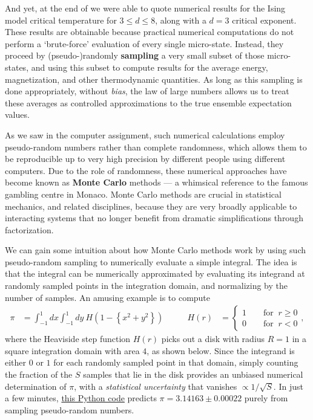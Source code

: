And yet, at the end of  we were able to quote numerical results for the Ising model critical temperature for $3 \leq d \leq 8$, along with a $d = 3$ critical exponent.
These results are obtainable because practical numerical computations do not perform a `brute-force' evaluation of every single micro-state.
Instead, they proceed by (pseudo-)randomly \textbf{sampling} a very small subset of those micro-states, and using this subset to compute results for the average energy, magnetization, and other thermodynamic quantities.
As long as this sampling is done appropriately, without \textit{bias}, the law of large numbers allows us to treat these averages as controlled approximations to the true ensemble expectation values.

As we saw in the computer assignment, such numerical calculations employ pseudo-random numbers rather than complete randomness, which allows them to be reproducible up to very high precision by different people using different computers.
Due to the role of randomness, these numerical approaches have become known as \textbf{Monte Carlo} methods --- a whimsical reference to the famous gambling centre in Monaco.
Monte Carlo methods are crucial in statistical mechanics, and related disciplines, because they are very broadly applicable to interacting systems that no longer benefit from dramatic simplifications through factorization.

We can gain some intuition about how Monte Carlo methods work by using such pseudo-random sampling to numerically evaluate a simple integral.
The idea is that the integral can be numerically approximated by evaluating its integrand at randomly sampled points in the integration domain, and normalizing by the number of samples.
An amusing example is to compute
\begin{align*}
  \pi & = \int_{-1}^1 dx \int_{-1}^1 dy \ H\!\left(1 - \left\{x^2 + y^2\right\}\right) \qquad &
  H(r) & = \left\{\begin{array}{l}1 \qquad \mbox{for } \ r \geq 0 \\
                                  0 \qquad \mbox{for } \ r < 0\end{array}\right. ,
\end{align*}
where the Heaviside step function $H(r)$ picks out a disk with radius $R = 1$ in a square integration domain with area $4$, as shown below.
Since the integrand is either $0$ or $1$ for each randomly sampled point in that domain, simply counting the fraction of the $S$ samples that lie in the disk provides an unbiased numerical determination of $\pi$, with a \textit{statistical uncertainty} that vanishes $\propto 1 / \sqrt{S}$.
In just a few minutes, \href{https://github.com/daschaich/MATH327_2025/blob/main/lecture_notes/unit10_pi.py}{this Python code} predicts $\pi = 3.14163 \pm 0.00022$ purely from sampling pseudo-random numbers.

